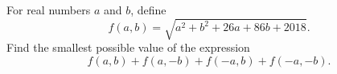 For real numbers $a$ and $b$,  define$$f(a,b) = \sqrt{a^2+b^2+26a+86b+2018}.$$Find the smallest possible value of the expression $$f(a, b) + f (a,-b) + f(-a, b) + f (-a, -b).$$